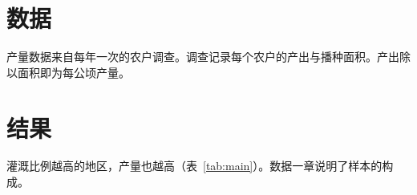 \documentclass{ctexart}
\begin{document}
\section{数据}
产量数据来自每年一次的农户调查。调查记录每个农户的产出与播种面积。产出除以面积即为每公顷产量。

\section{结果}
灌溉比例越高的地区，产量也越高（表~\ref{tab:main}）。数据一章说明了样本的构成。
\end{document}

